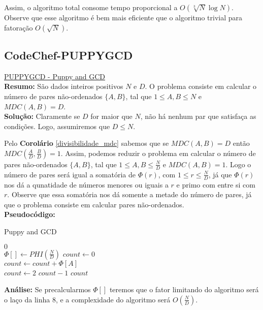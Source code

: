Assim, o algoritmo total consome tempo proporcional a $O(\sqrt[3]N \log N)$. 
Observe que esse algoritmo é bem mais eficiente que o algoritmo trivial para fatoração $O(\sqrt N)$.


\subsection{CodeChef-PUPPYGCD}
\href{https://www.codechef.com/problems/PUPPYGCD}{PUPPYGCD - Puppy and GCD}\\


\textbf{Resumo:}
São dados inteiros positivos $N$ e $D$. O problema consiste em calcular o número de pares não-ordenados $\{A,B\}$, tal que $1\leq A,B \leq N$ e $MDC(A,B)=D$.
\\

\textbf{Solução:}
Claramente se $D$ for maior que $N$, não há nenhum par que satisfaça as condições. Logo, assumiremos que $D \leq N$.

Pelo \textbf{Corolário} \autoref{divisibilidade_mdc} sabemos que se $MDC(A,B)=D$ então $MDC(\frac{A}{D}, \frac{B}{D})=1$. Assim, podemos reduzir o problema
em calcular o número de pares não-ordenados $\{A,B\}$, tal que $1\leq A,B \leq \frac{N}{D}$ e $MDC(A,B)=1$.
Logo o número de pares será igual a somatória de $\Phi(r)$, com $1 \leq r \leq \frac{N}{D}$, já que $\Phi(r)$ nos dá a qunatidade de números menores ou iguais a $r$ e primo com entre si com $r$. Observe que essa somatória nos dá somente a metade do número de pares, já que o problema consiste em calcular pares não-ordenados.
\\

\textbf{Pseudocódigo:}
\begin{algorithm}
\caption{Puppy and GCD}
\begin{algorithmic}[1]
\State \Return $0$
\EndIf
\\
\State $\Phi[] \gets PHI(\frac{N}{D})$
\State $count \gets 0$
\\
\State $count \gets count + \Phi[A]$
\EndFor
\\
\State $count \gets 2$ $count - 1$
\State \Return $count$
\EndProcedure
\end{algorithmic}
\end{algorithm}

\textbf{Análise:}
Se precalcularmos $\Phi[]$ teremos que o fator limitando do algoritmo será o laço da linha $8$, e a complexidade do algoritmo será $O(\frac{N}{D})$.

